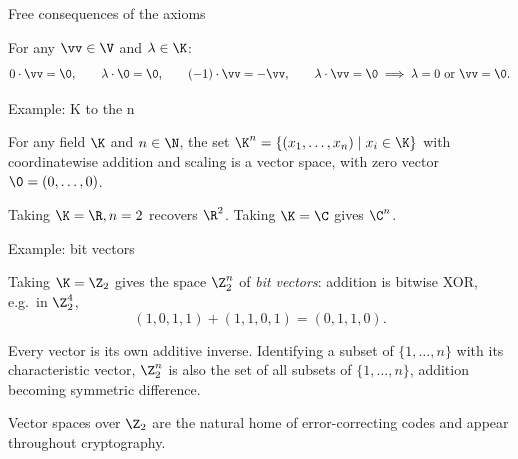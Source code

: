 \begin{frame}{Free consequences of the axioms}
\begin{fact}
For any $\vv\in\V$ and $\lambda\in\K$:
\[
0\cdot\vv=\0, \qquad \lambda\cdot\0=\0, \qquad (-1)\cdot\vv=-\vv, \qquad \lambda\cdot\vv=\0 \implies \lambda=0 \text{ or } \vv=\0.
\]
\end{fact}

\pause

\begin{steps}
\end{steps}
\end{frame}

\begin{frame}{Example: K to the n}
\begin{example}
For any field $\K$ and $n\in\N$, the set $\K^n=\{(x_1,\ldots,x_n)\mid x_i\in\K\}$ with coordinatewise
addition and scaling is a vector space, with zero vector $\0=(0,\ldots,0)$.

Taking $\K=\R,n=2$ recovers $\R^2$. Taking $\K=\C$ gives $\C^n$.
\end{example}
\end{frame}

\begin{frame}{Example: bit vectors}
\begin{example}
Taking $\K=\Z_2$ gives the space $\Z_2^n$ of \emph{bit vectors}: addition is bitwise XOR, e.g.\ in $\Z_2^4$,
\[
(1,0,1,1)+(1,1,0,1) = (0,1,1,0).
\]

\pause

Every vector is its own additive inverse. Identifying a subset of $\{1,\ldots,n\}$ with its characteristic
vector, $\Z_2^n$ is also the set of all subsets of $\{1,\ldots,n\}$, addition becoming symmetric difference.
\end{example}

\pause

\begin{remark}
Vector spaces over $\Z_2$ are the natural home of error-correcting codes and appear throughout cryptography.
\end{remark}
\end{frame}

